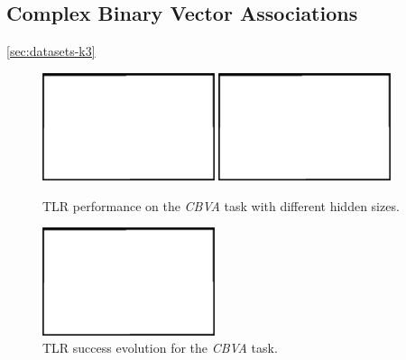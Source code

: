 
\subsection{Complex Binary Vector Associations} 
\label{sec:tlr-k3}

\ref{sec:datasets-k3} 


\begin{figure}[H]
  \centering
  \includegraphics[width=0.45\textwidth]{img/placeholder.png}   
  \includegraphics[width=0.45\textwidth]{img/placeholder.png}    
  \caption{TLR performance on the \emph{CBVA} task with different hidden sizes.}
  \label{fig:results-two-lambdas-k3-success}
\end{figure}

\begin{figure}[H]
  \centering
  \includegraphics[width=0.45\textwidth]{img/placeholder.png}    
  \caption{TLR success evolution for the \emph{CBVA} task.}
  \label{fig:results-two-lambdas-k3-epoch} 
\end{figure}
